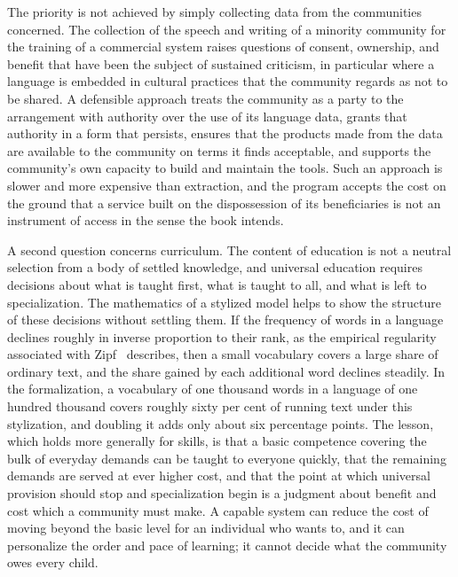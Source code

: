 The priority is not achieved by simply collecting data from the communities concerned. The collection of the speech and writing of a minority community for the training of a commercial system raises questions of consent, ownership, and benefit that have been the subject of sustained criticism, in particular where a language is embedded in cultural practices that the community regards as not to be shared. A defensible approach treats the community as a party to the arrangement with authority over the use of its language data, grants that authority in a form that persists, ensures that the products made from the data are available to the community on terms it finds acceptable, and supports the community's own capacity to build and maintain the tools. Such an approach is slower and more expensive than extraction, and the program accepts the cost on the ground that a service built on the dispossession of its beneficiaries is not an instrument of access in the sense the book intends.

A second question concerns curriculum. The content of education is not a neutral selection from a body of settled knowledge, and universal education requires decisions about what is taught first, what is taught to all, and what is left to specialization. The mathematics of a stylized model helps to show the structure of these decisions without settling them. If the frequency of words in a language declines roughly in inverse proportion to their rank, as the empirical regularity associated with Zipf~\cite{zipf1949} describes, then a small vocabulary covers a large share of ordinary text, and the share gained by each additional word declines steadily. In the formalization, a vocabulary of one thousand words in a language of one hundred thousand covers roughly sixty per cent of running text under this stylization, and doubling it adds only about six percentage points. The lesson, which holds more generally for skills, is that a basic competence covering the bulk of everyday demands can be taught to everyone quickly, that the remaining demands are served at ever higher cost, and that the point at which universal provision should stop and specialization begin is a judgment about benefit and cost which a community must make. A capable system can reduce the cost of moving beyond the basic level for an individual who wants to, and it can personalize the order and pace of learning; it cannot decide what the community owes every child.

